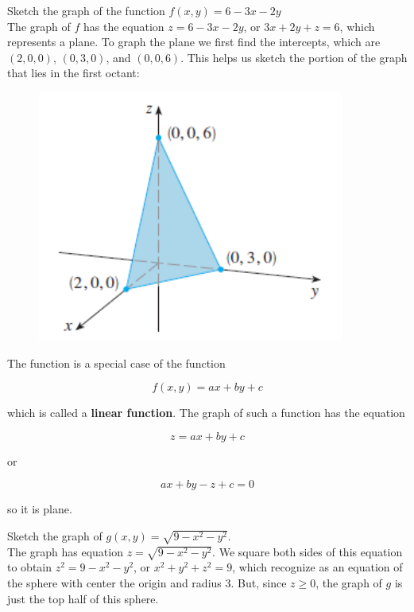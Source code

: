         \textit{} Sketch the graph of the function $f(x,y)=6-3x-2y$ \\

        The graph of $f$ has the equation $z=6-3x-2y$, or $3x+2y+z=6$, which represents a plane. To graph the plane we first find the intercepts, which are $(2,0,0)$, $(0,3,0)$, and $(0,0,6)$. This helps us sketch
        the portion of the graph that lies in the first octant:

        \begin{figure}[hbt!]
            \centering
            \includegraphics[scale = 0.75]{Resources/14.1_Linear_Function}
        \end{figure}

        The function is a special case of the function

        \[
            f(x,y) = ax + by + c
        \]

        which is called a \textbf{linear function}. The graph of such a function has the equation

        \[
            z = ax + by + c
        \]

        or

        \[
            ax + by - z + c =0
        \]

        so it is plane.

        \textit{} Sketch the graph of $g(x,y)=\sqrt{9-x^2 - y^2}$. \\

        The graph has equation $z=\sqrt{9-x^2-y^2}$. We square both sides of this equation to obtain $z^2 = 9-x^2 - y^2$, or $x^2 + y^2 + z^2 = 9$, which recognize as an equation of the sphere with center the origin 
        and radius 3. But, since $z\geq 0$, the graph of $g$ is just the top half of this sphere.

